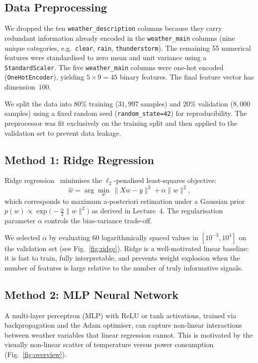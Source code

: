 \documentclass[a4, 10pt, conference]{ieeeconf}
\begin{document}
\subsection{Data Preprocessing}
We dropped the ten \texttt{weather\_description} columns because they carry redundant information already encoded in the \texttt{weather\_main} columns (nine unique categories, e.g.\ \texttt{clear}, \texttt{rain}, \texttt{thunderstorm}). The remaining 55 numerical features were standardised to zero mean and unit variance using a \texttt{StandardScaler}. The five \texttt{weather\_main} columns were one-hot encoded (\texttt{OneHotEncoder}), yielding $5 \times 9 = 45$ binary features. The final feature vector has dimension~$100$.

We split the data into 80\% training ($31{,}997$ samples) and 20\% validation ($8{,}000$ samples) using a fixed random seed (\texttt{random\_state=42}) for reproducibility. The preprocessor was fit exclusively on the training split and then applied to the validation set to prevent data leakage.

\subsection{Method 1: Ridge Regression}
Ridge regression~\cite{Tikhonov} minimises the $\ell_2$-penalised least-squares objective:
\begin{equation}
  \hat{w} = \arg\min_w \,\|Xw - y\|^2 + \alpha\|w\|^2,
\end{equation}
which corresponds to maximum a-posteriori estimation under a Gaussian prior $p(w) \propto \exp\!\bigl(-\frac{\alpha}{2}\|w\|^2\bigr)$ as derived in Lecture~4. The regularisation parameter $\alpha$ controls the bias-variance trade-off.

We selected $\alpha$ by evaluating 60 logarithmically spaced values in $[10^{-3}, 10^4]$ on the validation set (see Fig.~\ref{fig:ridge}). Ridge is a well-motivated linear baseline: it is fast to train, fully interpretable, and prevents weight explosion when the number of features is large relative to the number of truly informative signals.

\subsection{Method 2: MLP Neural Network}
A multi-layer perceptron (MLP) with ReLU or tanh activations, trained via backpropagation and the Adam optimiser, can capture non-linear interactions between weather variables that linear regression cannot. This is motivated by the visually non-linear scatter of temperature versus power consumption (Fig.~\ref{fig:overview}).
\end{document}

